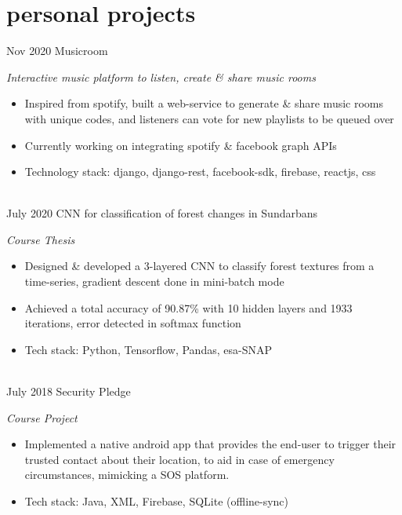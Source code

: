 \section{personal projects}
\begin{entrylist}
	\entry
	{Nov 2020}
	{Musicroom}
	{}
	{\emph{Interactive music platform to listen, create \& share music rooms}
		\begin{itemize}
			\item Inspired from spotify, built a web-service to generate \& share music rooms with unique codes, and listeners can vote for new playlists to be queued over
			\item Currently working on integrating spotify \& facebook graph APIs
			\item Technology stack: django, django-rest, facebook-sdk, firebase, reactjs, css
		\end{itemize}
	}
	\ \\
	\entry
	{July 2020}
	{CNN for classification of forest changes in Sundarbans}
	{}
	{\emph{Course Thesis}
		\begin{itemize}
			\item Designed \& developed a 3-layered CNN to classify forest textures from a time-series, gradient descent done in mini-batch mode
			\item Achieved a total accuracy of 90.87\% with 10 hidden layers and 1933 iterations, error detected in softmax function
			\item Tech stack: Python, Tensorflow, Pandas, esa-SNAP
		\end{itemize}
	}
	\ \\
	\entry
	{July 2018}
	{Security Pledge}
	{}
	{\emph{Course Project}
		\begin{itemize}
			\item Implemented a native android app that provides the end-user to trigger their trusted contact about their location, to aid in case of emergency circumstances, mimicking a SOS platform.
			\item Tech stack: Java, XML, Firebase, SQLite (offline-sync)
		\end{itemize}
	}

\end{entrylist}